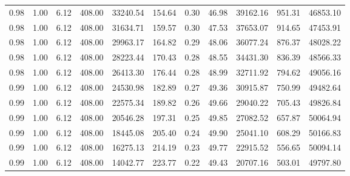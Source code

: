 \begin{table}[!ht]
\begin{tabular}{rrrrrrrrrrr}
0.98 & 1.00 & 6.12 & 408.00 & 33240.54 & 154.64 & 0.30 & 46.98 & 39162.16 & 951.31 & 46853.10 \\
0.98 & 1.00 & 6.12 & 408.00 & 31634.71 & 159.57 & 0.30 & 47.53 & 37653.07 & 914.65 & 47453.91 \\
0.98 & 1.00 & 6.12 & 408.00 & 29963.17 & 164.82 & 0.29 & 48.06 & 36077.24 & 876.37 & 48028.22 \\
0.98 & 1.00 & 6.12 & 408.00 & 28223.44 & 170.43 & 0.28 & 48.55 & 34431.30 & 836.39 & 48566.33 \\
0.98 & 1.00 & 6.12 & 408.00 & 26413.30 & 176.44 & 0.28 & 48.99 & 32711.92 & 794.62 & 49056.16 \\
0.99 & 1.00 & 6.12 & 408.00 & 24530.98 & 182.89 & 0.27 & 49.36 & 30915.87 & 750.99 & 49482.64 \\
0.99 & 1.00 & 6.12 & 408.00 & 22575.34 & 189.82 & 0.26 & 49.66 & 29040.22 & 705.43 & 49826.84 \\
0.99 & 1.00 & 6.12 & 408.00 & 20546.28 & 197.31 & 0.25 & 49.85 & 27082.52 & 657.87 & 50064.94 \\
0.99 & 1.00 & 6.12 & 408.00 & 18445.08 & 205.40 & 0.24 & 49.90 & 25041.10 & 608.29 & 50166.83 \\
0.99 & 1.00 & 6.12 & 408.00 & 16275.13 & 214.19 & 0.23 & 49.77 & 22915.52 & 556.65 & 50094.14 \\
0.99 & 1.00 & 6.12 & 408.00 & 14042.77 & 223.77 & 0.22 & 49.43 & 20707.16 & 503.01 & 49797.80 \\
\bottomrule
\end{tabular}

\end{table}